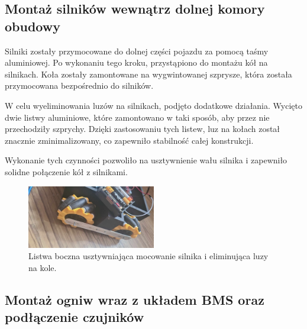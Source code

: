 \documentclass{report}
\begin{document}
\subsection{\Large Montaż silników wewnątrz dolnej komory obudowy}

%
%
Silniki zostały przymocowane do dolnej części pojazdu za pomocą taśmy aluminiowej. Po wykonaniu tego kroku, przystąpiono do montażu kół na silnikach. Koła zostały zamontowane na wygwintowanej szprysze, która została przymocowana bezpośrednio do silników.

W celu wyeliminowania luzów na silnikach, podjęto dodatkowe działania. Wycięto dwie listwy aluminiowe, które zamontowano w taki sposób, aby przez nie przechodziły szprychy. Dzięki zastosowaniu tych listew, luz na kołach został znacznie zminimalizowany, co zapewniło stabilność całej konstrukcji.

Wykonanie tych czynności pozwoliło na usztywnienie wału silnika i zapewniło solidne połączenie kół z silnikami.
\begin{figure}[H]
    \centering
    \includegraphics*[width=0.5\textwidth]{"src/Robot_pics/listwa-kola.jpg"}
    \caption{Listwa boczna usztywniająca mocowanie silnika i eliminująca luzy na kole.}
    \label{fig:listwa-kola}
\end{figure}

\newpage
\subsection{\Large Montaż ogniw wraz z układem BMS oraz podłączenie czujników}

%
%
\end{document}
